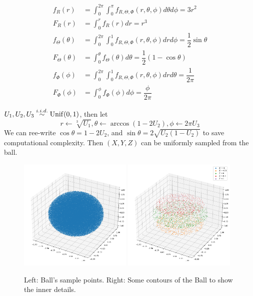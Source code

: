 \begin{homeworkProblem}
\begin{align*}
f_R(r) &= \int_{0}^{2\pi}\int_{0}^{\pi}f_{R, \Theta, \Phi}(r, \theta, \phi)d\theta d\phi = 3r^2 \\
F_R(r) &= \int_{0}^{r}f_R(r)dr = r^3 \\
f_{\Theta}(\theta) &= \int_{0}^{2\pi}\int_{0}^{1}f_{R, \Theta, \Phi}(r, \theta, \phi)dr d\phi = \dfrac{1}{2}\sin\theta \\
F_{\Theta}(\theta) &= \int_{0}^{\theta}f_{\Theta}(\theta)d\theta = \dfrac{1}{2}(1-\cos\theta) \\
f_{\Phi}(\phi) &= \int_{0}^{2\pi}\int_{0}^{1}f_{R, \Theta, \Phi}(r, \theta, \phi)dr d\theta = \dfrac{1}{2\pi} \\
F_{\Phi}(\phi) &= \int_{0}^{\phi}f_{\Phi}(\phi)d\phi = \dfrac{\phi}{2\pi}
\end{align*}

$U_1, U_2, U_3\stackrel{i.i.d.}{\sim} \operatorname{Unif}(0, 1)$, then let
$$r\leftarrow \sqrt[3]{U_1}, \theta\leftarrow \arccos(1-2U_2), \phi\leftarrow 2\pi U_3$$
We can ree-write $\cos\theta=1-2U_2$, and $\sin\theta=2\sqrt{U_2(1-U_2)}$ to save computational complexity.
Then $(X, Y, Z)$ can be uniformly sampled from the ball.

\begin{figure}[ht]
    \centering
    \includegraphics[width=0.48\textwidth]{./figure/p7/c_sample.png}
    \includegraphics[width=0.48\textwidth]{./figure/p7/c_contour.png}
    \caption{Left: Ball's sample points. Right: Some contours of the Ball to show the inner details.}
\end{figure}



\end{homeworkProblem}
